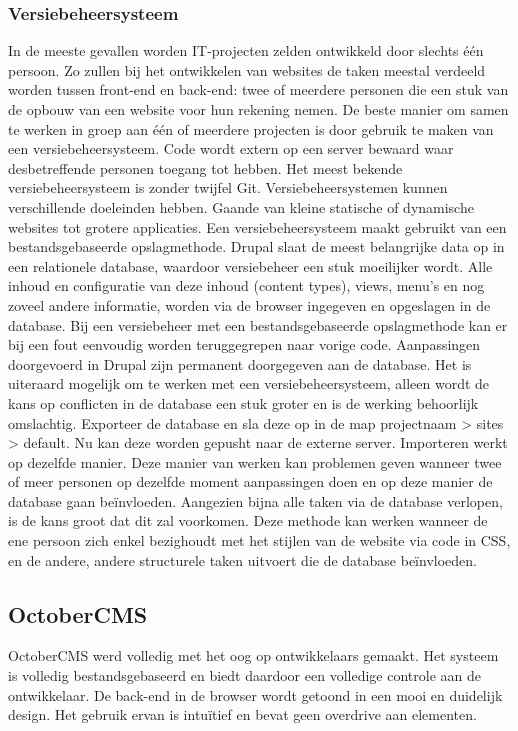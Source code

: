 \subsubsection{Versiebeheersysteem}
In de meeste gevallen worden IT-projecten zelden ontwikkeld door slechts één persoon. Zo zullen bij het ontwikkelen van websites de taken meestal verdeeld worden tussen front-end en back-end: twee of meerdere personen die een stuk van de opbouw van een website voor hun rekening nemen. De beste manier om samen te werken in groep aan één of meerdere projecten is door gebruik te maken van een versiebeheersysteem. Code wordt extern op een server bewaard waar desbetreffende personen toegang tot hebben. Het meest bekende versiebeheersysteem is zonder twijfel Git.
\newline\newline
Versiebeheersystemen kunnen verschillende doeleinden hebben. Gaande van kleine statische of dynamische websites tot grotere applicaties. 
\newline\newline
Een versiebeheersysteem maakt gebruikt van een bestandsgebaseerde opslagmethode. Drupal slaat de meest belangrijke data op in een relationele database, waardoor versiebeheer een stuk moeilijker wordt. Alle inhoud en configuratie van deze inhoud (content types), views, menu's en nog zoveel andere informatie, worden via de browser ingegeven en opgeslagen in de database. Bij een versiebeheer met een bestandsgebaseerde opslagmethode kan er bij een fout eenvoudig worden teruggegrepen naar vorige code. Aanpassingen doorgevoerd in Drupal zijn permanent doorgegeven aan de database. 
\newline\newline
Het is uiteraard mogelijk om te werken met een versiebeheersysteem, alleen wordt de kans op conflicten in de database een stuk groter en is de werking behoorlijk omslachtig. Exporteer de database en sla deze op in de map projectnaam > sites > default. Nu kan deze worden gepusht naar de externe server. Importeren werkt op dezelfde manier. Deze manier van werken kan problemen geven wanneer twee of meer personen op dezelfde moment aanpassingen doen en op deze manier de database gaan beïnvloeden. Aangezien bijna alle taken via de database verlopen, is de kans groot dat dit zal voorkomen. Deze methode kan werken wanneer de ene persoon zich enkel bezighoudt met het stijlen van de website via code in CSS, en de andere, andere structurele taken uitvoert die de database beïnvloeden.


\subsection{OctoberCMS}
OctoberCMS werd volledig met het oog op ontwikkelaars gemaakt. Het systeem is volledig bestandsgebaseerd en biedt daardoor een volledige controle aan de ontwikkelaar. De back-end in de browser wordt getoond in een mooi en duidelijk design. Het gebruik ervan is intuïtief en bevat geen overdrive aan elementen.

